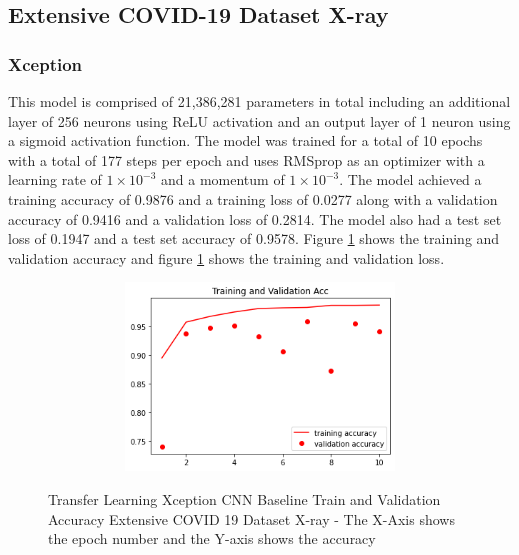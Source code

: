 \subsection{Extensive COVID-19 Dataset X-ray}
\subsubsection{Xception}
This model is comprised of 21,386,281 parameters in total including an additional layer of 256 neurons using ReLU activation and an output layer of 1 neuron using a sigmoid activation function.  The model was trained for a total of 10 epochs with a total of 177 steps per epoch and uses RMSprop as an optimizer with a learning rate of $1\times10^{-3}$ and a momentum of $1\times10^{-3}$.  The model achieved a training accuracy of 0.9876 and a training loss of 0.0277 along with a validation accuracy of 0.9416 and a validation loss of 0.2814.  The model also had a test set loss of 0.1947 and a test set accuracy of 0.9578. Figure \ref{fig:Xception CNN Baseline Train and Validation Accuracy Extensive COVID 19 Dataset X-ray} shows the training and validation accuracy and figure \ref{fig:Xception CNN Baseline Train and Validation Accuracy Extensive COVID 19 Dataset X-ray} shows the training and validation loss.
 \begin{figure}[H]
    \centering
    \includegraphics[width=1\textwidth,height=5cm,keepaspectratio]{Images/XceptionBaselineTrainingValidationAccuracyExtensiveXray.png}\\
    \caption{Transfer Learning Xception CNN Baseline Train and Validation Accuracy Extensive COVID 19 Dataset X-ray - The X-Axis shows the epoch number and the Y-axis shows the accuracy}
    \label{fig:Xception CNN Baseline Train and Validation Accuracy Extensive COVID 19 Dataset X-ray}
\end{figure}
